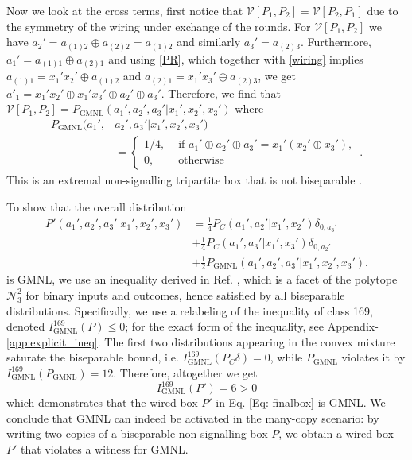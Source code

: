 \documentclass[pra,aps,reprint,superscriptaddress]{revtex4-2}
\theoremstyle{theorem}
\begin{document}
Now we look at the cross terms, first notice that $\mathcal{V}[P_1,P_2]=\mathcal{V}[P_2,P_1]$ due to the symmetry of the wiring under exchange of the rounds. For $\mathcal{V}[P_1,P_2]$ we have $a_2' = a_{(1)2}\oplus a_{(2)2} = a_{(1)2}$ and similarly $a_3' = a_{(2)3}$. Furthermore, $a_1' = a_{(1)1}\oplus a_{(2)1}$ and using  \eqref{PR}, which together with \eqref{wiring} implies $a_{(1)1} = x_1'x_2' \oplus a_{(1)2}$ and $a_{(2)1} = x_1'x_3' \oplus a_{(2)3}$, we get $a'_1 = x_1'x_2'\oplus x_1'x_3' \oplus a_2'\oplus a_3'$. Therefore, we find that $\mathcal{V}[P_1,P_2] = P_{\mathrm{GMNL}}(a_1',a_2',a_3'|x_1',x_2',x_3')$ where
\begin{align}\nonumber
    P_{\textrm{GMNL}}(a_1',&a_2',a_3'|x_1',x_2',x_3') \\&= \begin{cases}
1/4, & \text{ if } a_1'\oplus a_2'\oplus a_3'=x_1'(x_2'\oplus x_3'),\\
0, & \text{ otherwise}
\end{cases} \, .
\end{align}
This is an extremal non-signalling tripartite box that is not biseparable \cite{Barrett_2005,Pironio_2011}. 

To show that the overall distribution 
\begin{align}\nonumber
    P'(a_1',a_2',a_3'|x_1',x_2',x_3') &= \frac{1}{4}P_C(a_1',a_2'|x_1',x_2')\delta_{0,a_3'}\\&\nonumber + \frac{1}{4}P_C(a_1',a_3'|x_1',x_3')\delta_{0,a_2'}
    \\& + \frac{1}{2}P_{\mathrm{GMNL}}(a_1',a_2',a_3'|x_1',x_2',x_3').\label{Eq: finalbox}
\end{align}
is GMNL, we use an inequality derived in Ref. \cite{Bancal2013}, which is a facet of the polytope $\mathcal{N}^2_3$ for binary inputs and outcomes, hence satisfied by all biseparable distributions. Specifically, we use a relabeling of the inequality of class 169, denoted $I_{\mathrm{GMNL}}^{169}(P) \leq 0$; for the exact form of the inequality, see Appendix-\ref{app:explicit_ineq}.
The first two distributions appearing in the convex mixture saturate the biseparable bound, i.e. $I_{\mathrm{GMNL}}^{169}(P_C\delta)=0$, while $P_{\mathrm{GMNL}}$ violates it by $I_{\mathrm{GMNL}}^{169}(P_{\mathrm{GMNL}})=12$. Therefore, altogether we get 
\begin{equation}
I_{\mathrm{GMNL}}^{169}(P')=6>0
\end{equation}
which demonstrates that the wired box $P'$ in Eq. \eqref{Eq: finalbox} is GMNL. We conclude that GMNL can indeed be activated in the many-copy scenario: by writing two copies of a biseparable non-signalling box $P$, we obtain a wired box $P'$ that violates a witness for GMNL. 
\end{document}

